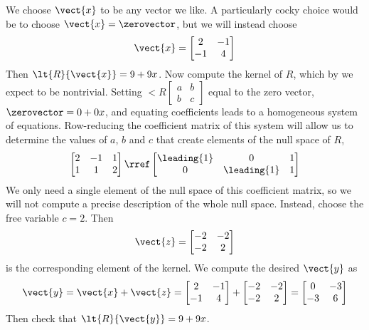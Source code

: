 We choose $\vect{x}$ to be any vector we like.  A particularly cocky choice would be to choose $\vect{x}=\zerovector$, but we will instead choose  
%
\begin{equation*}
\vect{x}= \begin{bmatrix} 2 & -1 \\ -1 & 4 \end{bmatrix}
\end{equation*}
%
Then $\lt{R}{\vect{x}}=9+9x$.  Now compute the kernel of $R$, which by  we expect to be nontrivial.  Setting $\lt{R}{\begin{bmatrix}a&b\\b&c\end{bmatrix}}$ equal to the zero vector, $\zerovector=0+0x$, and equating coefficients leads to a homogeneous system of equations.  Row-reducing the coefficient matrix of this system will allow us to determine the values of $a$, $b$ and $c$ that create elements of the null space of $R$,
%
\begin{equation*}
\begin{bmatrix}
 2 & -1 & 1 \\
 1 & 1 & 2
\end{bmatrix}
\rref
\begin{bmatrix}
 \leading{1} & 0 & 1 \\
 0 & \leading{1} & 1
\end{bmatrix}
\end{equation*}
%
We only need a single element of the null space of this coefficient matrix, so we will not compute a precise description of the whole null space.  Instead, choose the free variable $c=2$.  Then
%
\begin{equation*}
\vect{z}=\begin{bmatrix} -2 & -2 \\ -2 & 2\end{bmatrix}
\end{equation*}
%
is the corresponding element of the kernel.  We compute the desired $\vect{y}$ as
%
\begin{equation*}
\vect{y}=\vect{x}+\vect{z}=
\begin{bmatrix} 2 & -1 \\ -1 & 4 \end{bmatrix}
+
\begin{bmatrix} -2 & -2 \\ -2 & 2\end{bmatrix}
=
\begin{bmatrix}  0 & -3 \\ -3 & 6 \end{bmatrix}
\end{equation*}
%
Then check that $\lt{R}{\vect{y}}=9+9x$.